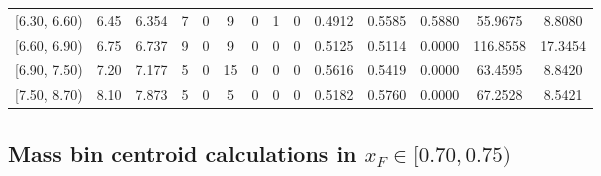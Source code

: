 \begin{table}[htbp]
{\begin{tabular}{cc|c|cccccc|ccc|cc}
        {[6.30, 6.60)} & 6.45 & 6.354 & 7 & 0 & 9 & 0 & 1 & 0 & 0.4912 & 0.5585 & 0.5880 & 55.9675 & 8.8080 \\
        {[6.60, 6.90)} & 6.75 & 6.737 & 9 & 0 & 9 & 0 & 0 & 0 & 0.5125 & 0.5114 & 0.0000 & 116.8558 & 17.3454 \\
        {[6.90, 7.50)} & 7.20 & 7.177 & 5 & 0 & 15 & 0 & 0 & 0 & 0.5616 & 0.5419 & 0.0000 & 63.4595 & 8.8420 \\
        {[7.50, 8.70)} & 8.10 & 7.873 & 5 & 0 & 5 & 0 & 0 & 0 & 0.5182 & 0.5760 & 0.0000 & 67.2528 & 8.5421 \\
        \hline\hline
    \end{tabular}
    }
\end{table}

\clearpage
\subsection{\texorpdfstring{Mass bin centroid calculations in $x_F \in [0.70, 0.75)$}{Mass bin centroid calculations in x\_F in [0.70, 0.75)]}}

